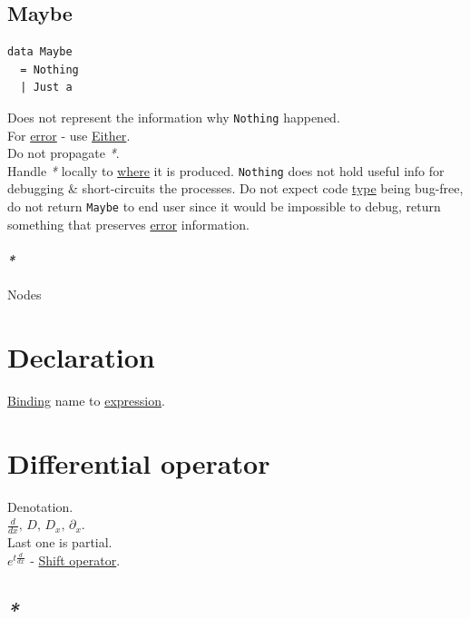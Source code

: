 \documentclass[a4paper,14pt,oneside]{book}
\begin{document}
\section{\label{orga9bddfc}Maybe}
\label{sec:org7fd6867}
\begin{verbatim}
data Maybe
  = Nothing
  | Just a
\end{verbatim}

Does not represent the information why \texttt{Nothing} happened.\\
For \hyperref[org9c3672b]{error} - use \hyperref[org260eea7]{Either}.\\
Do not propagate \emph{*}.\\

Handle \emph{*} locally to \hyperref[orgd3dc8e4]{where} it is produced. \texttt{Nothing} does not hold useful info for debugging \& short-circuits the processes. Do not expect code \hyperref[orgd6db20c]{type} being bug-free, do not return \texttt{Maybe} to end user since it would be impossible to debug, return something that preserves \hyperref[org9c3672b]{error} information.\\

\subsubsection{\emph{*}}
\label{sec:orgd4b60f3}

\label{org4a6f093}Nodes\\

\chapter{\label{org9487164}Declaration}
\label{sec:org8a6c318}
\hyperref[orgac1c0eb]{Binding} name to \hyperref[org6aa6989]{expression}.\\

\chapter{\label{org97e77ee}Differential operator}
\label{sec:orgce49313}
Denotation.\\
\(\frac{d}{dx}, \, D, \, D_{x}, \, \partial_{x}.\)\\
Last one is partial.\\

\(e^{t{\frac{d}{dx}}}\) - \hyperref[org71cee43]{Shift operator}.\\

\section{\emph{*}}
\label{sec:orgf8f3c2d}
\end{document}

